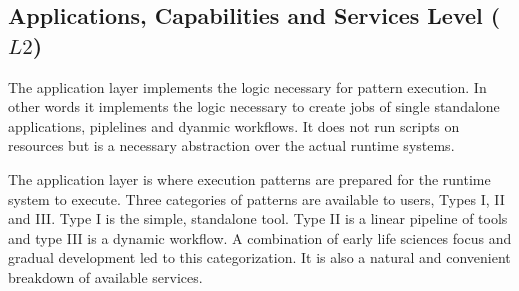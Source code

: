 \documentclass[]{svjour3}
\begin{document}


\subsection{Applications, Capabilities and Services Level ($L2$)}


The application layer implements the logic necessary for pattern
execution. In other words it implements the logic necessary to
create jobs of single standalone applications, piplelines and
dyanmic workflows. It does not run scripts on resources but is
a necessary abstraction over the actual runtime systems. 

The application layer is where execution patterns are prepared for the
runtime system to execute. Three categories of patterns are available
to users, Types I, II and III. Type I is the simple, standalone tool. 
Type II is a linear pipeline of tools and type III is a dynamic workflow.
A combination of early life sciences focus and gradual development
led to this categorization. It is also a natural and convenient
breakdown of available services.

\end{document}
